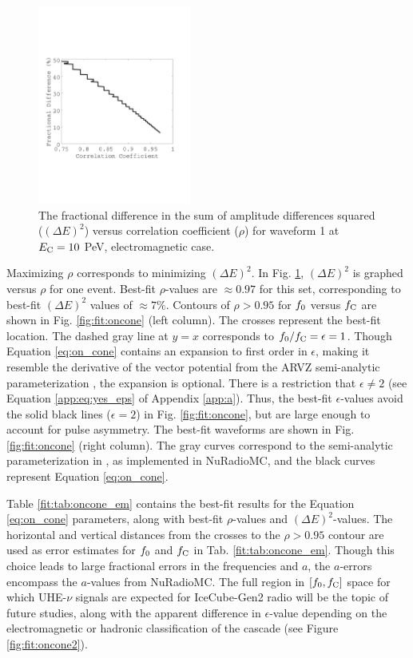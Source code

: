 \documentclass[amsmath,amssymb,aps,prd,10pt,twocolumn]{revtex4}
\begin{document}
\begin{figure}
\centering
\includegraphics[width=0.45\textwidth,trim=0cm 6cm 0cm 6cm,clip=true]{f_vs_rho.pdf}
\caption{\label{fig:f_vs_rho}  The fractional difference in the sum of amplitude differences squared ($(\Delta E)^2$) versus correlation coefficient ($\rho$) for waveform 1 at $E_{\rm C} = 10$ PeV, electromagnetic case.}
\end{figure}

Maximizing $\rho$ corresponds to minimizing $(\Delta E)^2$.  In Fig. \ref{fig:f_vs_rho}, $(\Delta E)^2$ is graphed versus $\rho$ for one event.  Best-fit $\rho$-values are $\approx 0.97$ for this set, corresponding to best-fit $(\Delta E)^2$ values of $\approx 7\%$.  Contours of $\rho>0.95$ for $f_{\rm 0}$ versus $f_{\rm C}$ are shown in Fig. \ref{fig:fit:oncone} (left column). The crosses represent the best-fit location.  The dashed gray line at $y=x$ corresponds to $f_{\rm 0}/f_{\rm C} = \epsilon = 1$.  Though Equation \ref{eq:on_cone} contains an expansion to first order in $\epsilon$, making it resemble the derivative of the vector potential from the ARVZ semi-analytic parameterization \cite{PhysRevD.101.083005}, the expansion is optional.  There is a restriction that $\epsilon \neq 2$ (see Equation \ref{app:eq:yes_eps} of Appendix \ref{app:a}).  Thus, the best-fit $\epsilon$-values avoid the solid black lines ($\epsilon = 2$) in Fig. \ref{fig:fit:oncone}, but are large enough to account for pulse asymmetry.  The best-fit waveforms are shown in Fig. \ref{fig:fit:oncone} (right column).  The gray curves correspond to the semi-analytic parameterization in \cite{PhysRevD.101.083005}, as implemented in NuRadioMC, and the black curves represent Equation \ref{eq:on_cone}.

Table \ref{fit:tab:oncone_em} contains the best-fit results for the Equation \ref{eq:on_cone} parameters, along with best-fit $\rho$-values and $(\Delta E)^2$-values.  The horizontal and vertical distances from the crosses to the $\rho > 0.95$ contour are used as error estimates for $f_{\rm 0}$ and $f_{\rm C}$ in Tab. \ref{fit:tab:oncone_em}.  Though this choice leads to large fractional errors in the frequencies and $a$, the $a$-errors encompass the $a$-values from NuRadioMC.  The full region in $[f_{\rm 0},f_{\rm C}]$ space for which UHE-$\nu$ signals are expected for IceCube-Gen2 radio will be the topic of future studies, along with the apparent difference in $\epsilon$-value depending on the electromagnetic or hadronic classification of the cascade (see Figure \ref{fig:fit:oncone2}).
\end{document}

